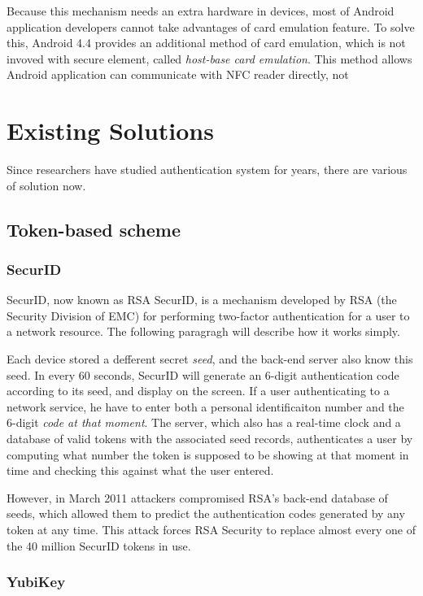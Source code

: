 \begin{CJK}{Bg5}{bsmi}
Because this mechanism needs an extra hardware in devices, most of Android application developers cannot take advantages of card emulation feature. To solve this, Android 4.4 provides an additional method of card emulation, which is not invoved with secure element, called \emph{host-base card emulation}. This method allows Android application can communicate with NFC reader directly, not 

\section{Existing Solutions}

Since researchers have studied authentication system for years, there are various of solution now. 

\subsection{Token-based scheme}

\subsubsection{SecurID}

SecurID, now known as RSA SecurID, is a mechanism developed by RSA (the Security Division of EMC) for performing two-factor authentication for a user to a network resource. The following paragragh will describe how it works simply.

Each device stored a defferent secret \emph{seed}, and the back-end server also know this seed. In every 60 seconds, SecurID will generate an 6-digit authentication code according to its seed, and display on the screen. If a user authenticating to a network service, he have to enter both a personal identificaiton number and the 6-digit \emph{code at that moment}. The server, which also has a real-time clock and a database of valid tokens with the associated seed records, authenticates a user by computing what number the token is supposed to be showing at that moment in time and checking this against what the user entered.

However, in March 2011 attackers compromised RSA's back-end database of seeds, which allowed them to predict the authentication codes generated by any token at any time. This attack forces RSA Security to replace almost every one of the 40 million SecurID tokens in use.

\subsubsection{YubiKey}


\end{CJK}
